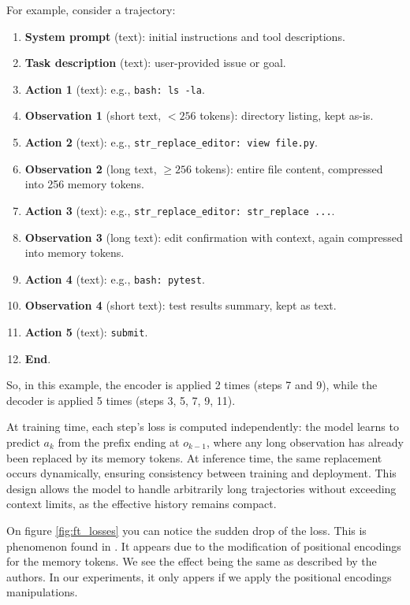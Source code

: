 For example, consider a trajectory:
\begin{enumerate}
  \item \textbf{System prompt} (text): initial instructions and tool descriptions.
  \item \textbf{Task description} (text): user-provided issue or goal.
  \item \textbf{Action 1} (text): e.g., \texttt{bash: ls -la}.
  \item \textbf{Observation 1} (short text, $<256$ tokens): directory listing, kept as-is.
  \item \textbf{Action 2} (text): e.g., \texttt{str\_replace\_editor: view file.py}.
  \item \textbf{Observation 2} (long text, $\geq 256$ tokens): entire file content, compressed into 256 memory tokens.
  \item \textbf{Action 3} (text): e.g., \texttt{str\_replace\_editor: str\_replace ...}.
  \item \textbf{Observation 3} (long text): edit confirmation with context, again compressed into memory tokens.
  \item \textbf{Action 4} (text): e.g., \texttt{bash: pytest}.
  \item \textbf{Observation 4} (short text): test results summary, kept as text.
  \item \textbf{Action 5} (text): \texttt{submit}.
  \item \textbf{End}.
\end{enumerate}
So, in this example, the encoder is applied 2 times (steps 7 and 9), while the decoder is applied 5 times (steps 3, 5, 7, 9, 11).

At training time, each step's loss is computed independently: the model learns to predict \(a_k\) from the prefix ending at \(o_{k-1}\), where any long observation has already been replaced by its memory tokens.
At inference time, the same replacement occurs dynamically, ensuring consistency between training and deployment.
This design allows the model to handle arbitrarily long trajectories without exceeding context limits, as the effective history remains compact.

On figure \ref{fig:ft_losses} you can notice the sudden drop of the loss.
This is phenomenon found in \cite{PI}.
It appears due to the modification of positional encodings for the memory tokens.
We see the effect being the same as described by the authors.
In our experiments, it only appers if we apply the positional encodings manipulations.

